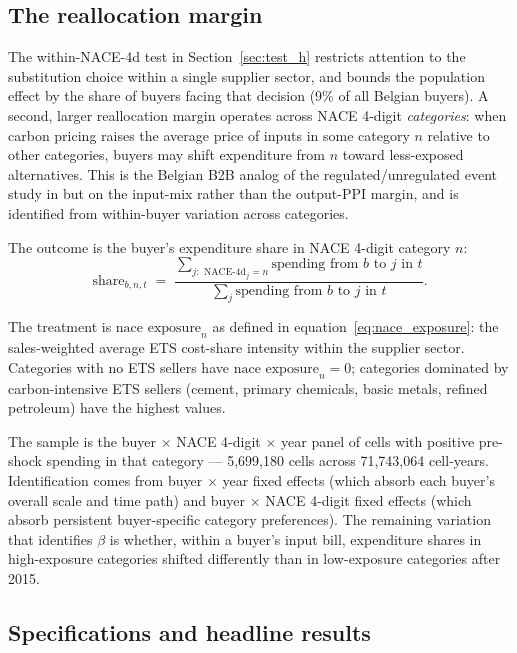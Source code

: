 \subsection{The reallocation margin}

The within-NACE-4d test in Section~\ref{sec:test_h} restricts attention to the substitution choice within a single supplier sector, and bounds the population effect by the share of buyers facing that decision (9\% of all Belgian buyers). A second, larger reallocation margin operates across NACE 4-digit \emph{categories}: when carbon pricing raises the average price of inputs in some category $n$ relative to other categories, buyers may shift expenditure from $n$ toward less-exposed alternatives. This is the Belgian B2B analog of the regulated/unregulated event study in \citet{colmeretal2023} but on the input-mix rather than the output-PPI margin, and is identified from within-buyer variation across categories.

The outcome is the buyer's expenditure share in NACE 4-digit category $n$:
\begin{equation}
    \text{share}_{b,n,t} \;=\; \frac{\sum_{j: \text{ NACE-4d}_j = n} \text{spending from } b \text{ to } j \text{ in } t}{\sum_{j} \text{spending from } b \text{ to } j \text{ in } t}.
    \label{eq:share_bnt}
\end{equation}

The treatment is $\text{nace exposure}_n$ as defined in equation~\eqref{eq:nace_exposure}: the sales-weighted average ETS cost-share intensity within the supplier sector. Categories with no ETS sellers have $\text{nace exposure}_n = 0$; categories dominated by carbon-intensive ETS sellers (cement, primary chemicals, basic metals, refined petroleum) have the highest values.

The sample is the buyer $\times$ NACE 4-digit $\times$ year panel of cells with positive pre-shock spending in that category --- 5{,}699{,}180 cells across 71{,}743{,}064 cell-years. Identification comes from buyer $\times$ year fixed effects (which absorb each buyer's overall scale and time path) and buyer $\times$ NACE 4-digit fixed effects (which absorb persistent buyer-specific category preferences). The remaining variation that identifies $\beta$ is whether, within a buyer's input bill, expenditure shares in high-exposure categories shifted differently than in low-exposure categories after 2015.

\subsection{Specifications and headline results}

